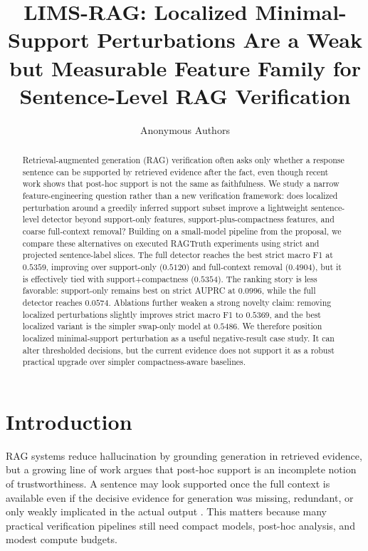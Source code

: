 \documentclass{article}
\title{LIMS-RAG: Localized Minimal-Support Perturbations Are a Weak but Measurable Feature Family for Sentence-Level RAG Verification}
\author{Anonymous Authors}
\begin{document}
\maketitle

\begin{abstract}
Retrieval-augmented generation (RAG) verification often asks only whether a response sentence can be supported by retrieved evidence after the fact, even though recent work shows that post-hoc support is not the same as faithfulness. We study a narrow feature-engineering question rather than a new verification framework: does localized perturbation around a greedily inferred support subset improve a lightweight sentence-level detector beyond support-only features, support-plus-compactness features, and coarse full-context removal? Building on a small-model pipeline from the proposal, we compare these alternatives on executed RAGTruth experiments using strict and projected sentence-label slices. The full detector reaches the best strict macro F1 at $0.5359$, improving over support-only ($0.5120$) and full-context removal ($0.4904$), but it is effectively tied with support+compactness ($0.5354$). The ranking story is less favorable: support-only remains best on strict AUPRC at $0.0996$, while the full detector reaches $0.0574$. Ablations further weaken a strong novelty claim: removing localized perturbations slightly improves strict macro F1 to $0.5369$, and the best localized variant is the simpler swap-only model at $0.5486$. We therefore position localized minimal-support perturbation as a useful negative-result case study. It can alter thresholded decisions, but the current evidence does not support it as a robust practical upgrade over simpler compactness-aware baselines.
\end{abstract}

\section{Introduction}
RAG systems reduce hallucination by grounding generation in retrieved evidence, but a growing line of work argues that post-hoc support is an incomplete notion of trustworthiness. A sentence may look supported once the full context is available even if the decisive evidence for generation was missing, redundant, or only weakly implicated in the actual output \citep{wallat2024correctness,wu-etal-2024-synchronous}. This matters because many practical verification pipelines still need compact models, post-hoc analysis, and modest compute budgets.
\end{document}
